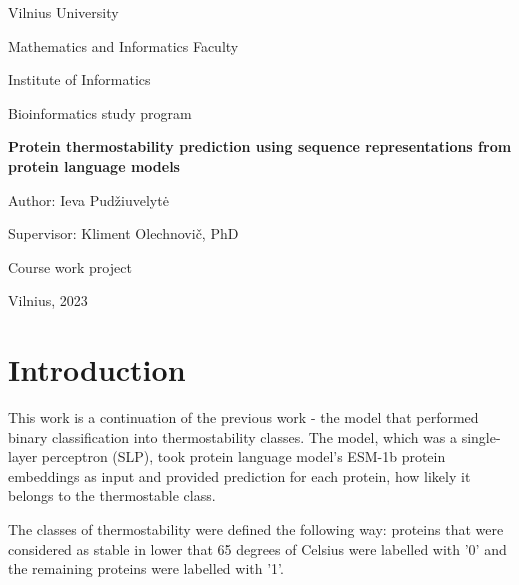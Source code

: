 \documentclass[12pt]{article}
\begin{document}
	\begin{center}

	    \vspace*{1cm}
	    \Large
	    Vilnius University

		Mathematics and Informatics Faculty

		Institute of Informatics 

		Bioinformatics study program
	    
        \vspace*{2cm}
        \Large
		\textbf{Protein thermostability prediction using 
		sequence representations from protein 
		language models}

	\end{center}

	\begin{flushright}

		\vspace*{2cm}
        \large
        Author: Ieva Pudžiuvelytė

        Supervisor: Kliment Olechnovič, PhD 
        
	\end{flushright}

	\begin{center}
		\vspace*{4cm}
        \large
        Course work project
        
        \vspace*{2cm}
        \large
        Vilnius, 2023
	\end{center}
	
	\newpage

	\tableofcontents

	\newpage
	
	\section{Introduction}

	This work is a continuation of the previous work - the model 
	that performed binary classification into thermostability 
	classes. The model, which was a single-layer perceptron (SLP), 
    took protein language model's ESM-1b \cite{rives2021biological} 
	protein embeddings as input 
	and provided prediction for each protein, how likely it 
	belongs to the thermostable class.

    The classes of thermostability were defined the following 
    way: proteins that were considered as stable in lower that 
    65 degrees of Celsius were labelled with '0' and the remaining
	proteins were labelled with '1'. 
    
\end{document}
